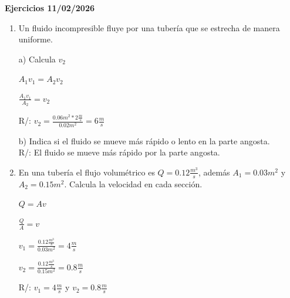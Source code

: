 \documentclass[a4paper, 11pt]{article}
\newcommand{\Pspace}{0.5cm}
\newcommand{\Aspace}{0.2cm}
\begin{document}
    \vspace{\Pspace}
    {\Large \textbf{Ejercicios 11/02/2026}}
    \begin{enumerate}
        \vspace{\Pspace}
        \item Un fluido incompresible fluye por una tubería que se estrecha de manera uniforme. \par
            \vspace{\Aspace} \par
            a) Calcula $v_2$
            \\ { \color{azul} 
                $A_1v_1 = A_2v_2$
                \par $\frac{A_1v_1}{A_2} = v_2$
                \par R/: $v_2 = \frac{0.06m^2 * 2\frac{m}{s}}{0.02m^2} = 6\frac{m}{s}$
            }

            \vspace{\Aspace} \par
            b) Indica si el fluido se mueve más rápido o lento en la parte angosta.
            \\ { \color{azul} 
                R/: El fluido se mueve más rápido por la parte angosta.
            }



        \vspace{\Pspace}
        \item En una tubería el flujo volumétrico es $Q = 0.12\frac{m^3}{s}$, además $A_1 = 0.03m^2$ y $A_2 = 0.15m^2$. Calcula la velocidad en cada sección.\par
            \vspace{\Aspace} \par
            { \color{azul} 
                $Q = Av$
                \par $\frac{Q}{A} = v$
                \par $v_1 = \frac{0.12\frac{m^3}{s}}{0.03m^2} = 4 \frac{m}{s}$
                \par $v_2 = \frac{0.12\frac{m^3}{s}}{0.15m^2} = 0.8 \frac{m}{s}$
                \par R/: $v_1 = 4 \frac{m}{s}$ y $v_2 = 0.8\frac{m}{s}$
            }




\end{enumerate}
\end{document}
